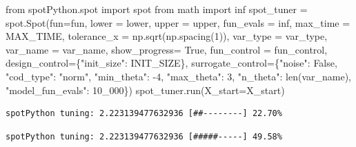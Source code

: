 \documentclass[
  letterpaper,
  DIV=11,
  numbers=noendperiod]{scrreprt}
\newenvironment{Shaded}{\begin{snugshade}}{\end{snugshade}}
\newcommand{\BuiltInTok}[1]{\textcolor[rgb]{0.00,0.23,0.31}{#1}}
\newcommand{\DecValTok}[1]{\textcolor[rgb]{0.68,0.00,0.00}{#1}}
\newcommand{\ImportTok}[1]{\textcolor[rgb]{0.00,0.46,0.62}{#1}}
\newcommand{\NormalTok}[1]{\textcolor[rgb]{0.00,0.23,0.31}{#1}}
\newcommand{\OperatorTok}[1]{\textcolor[rgb]{0.37,0.37,0.37}{#1}}
\newcommand{\StringTok}[1]{\textcolor[rgb]{0.13,0.47,0.30}{#1}}
\newcommand{\VariableTok}[1]{\textcolor[rgb]{0.07,0.07,0.07}{#1}}
\begin{document}
\begin{Shaded}
\begin{Highlighting}[]
\ImportTok{from}\NormalTok{ spotPython.spot }\ImportTok{import}\NormalTok{ spot}
\ImportTok{from}\NormalTok{ math }\ImportTok{import}\NormalTok{ inf}
\NormalTok{spot\_tuner }\OperatorTok{=}\NormalTok{ spot.Spot(fun}\OperatorTok{=}\NormalTok{fun,}
\NormalTok{                   lower }\OperatorTok{=}\NormalTok{ lower,}
\NormalTok{                   upper }\OperatorTok{=}\NormalTok{ upper,}
\NormalTok{                   fun\_evals }\OperatorTok{=}\NormalTok{ inf,}
\NormalTok{                   max\_time }\OperatorTok{=}\NormalTok{ MAX\_TIME,}
\NormalTok{                   tolerance\_x }\OperatorTok{=}\NormalTok{ np.sqrt(np.spacing(}\DecValTok{1}\NormalTok{)),}
\NormalTok{                   var\_type }\OperatorTok{=}\NormalTok{ var\_type,}
\NormalTok{                   var\_name }\OperatorTok{=}\NormalTok{ var\_name,}
\NormalTok{                   show\_progress}\OperatorTok{=} \VariableTok{True}\NormalTok{,}
\NormalTok{                   fun\_control }\OperatorTok{=}\NormalTok{ fun\_control,}
\NormalTok{                   design\_control}\OperatorTok{=}\NormalTok{\{}\StringTok{"init\_size"}\NormalTok{: INIT\_SIZE\},}
\NormalTok{                   surrogate\_control}\OperatorTok{=}\NormalTok{\{}\StringTok{"noise"}\NormalTok{: }\VariableTok{False}\NormalTok{,}
                                      \StringTok{"cod\_type"}\NormalTok{: }\StringTok{"norm"}\NormalTok{,}
                                      \StringTok{"min\_theta"}\NormalTok{: }\OperatorTok{{-}}\DecValTok{4}\NormalTok{,}
                                      \StringTok{"max\_theta"}\NormalTok{: }\DecValTok{3}\NormalTok{,}
                                      \StringTok{"n\_theta"}\NormalTok{: }\BuiltInTok{len}\NormalTok{(var\_name),}
                                      \StringTok{"model\_fun\_evals"}\NormalTok{: }\DecValTok{10\_000}\NormalTok{\})}
\NormalTok{spot\_tuner.run(X\_start}\OperatorTok{=}\NormalTok{X\_start)}
\end{Highlighting}
\end{Shaded}

\begin{verbatim}
spotPython tuning: 2.223139477632936 [##--------] 22.70% 
\end{verbatim}

\begin{verbatim}
spotPython tuning: 2.223139477632936 [#####-----] 49.58% 
\end{verbatim}
\end{document}
